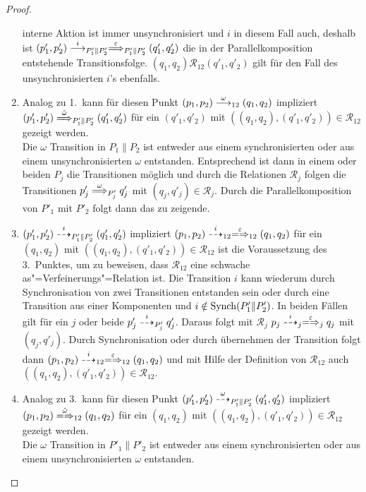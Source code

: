 \begin{proof}
\begin{enumerate}
      interne Aktion ist immer unsynchronisiert und $i$ in diesem Fall auch,
      deshalb ist $(p'_1,p'_2)\must[i]_{P'_1\|P'_2}
      \weakmust[\varepsilon]_{P'_1\|P'_2} (q'_1,q'_2)$ die in der
      Parallelkomposition entstehende Transitionsfolge.
      $(q_1,q_2)\mathcal{R}_{12}(q'_1,q'_2)$ gilt für den Fall des
      unsynchronisierten $i$'s ebenfalls.
    \item Analog zu 1.\ kann für diesen Punkt
      $(p_1,p_2)\must[\omega]_{12}(q_1,q_2)$ impliziert $(p'_1,p'_2)
      \weakmust[\hat{\omega}]_{P'_1\|P'_2} (q'_1,q'_2)$ für ein $(q'_1,q'_2)$
      mit $((q_1,q_2),(q'_1,q'_2))\in\mathcal{R}_{12}$ gezeigt werden.\\
      Die $\omega$ Transition in $P_1\|P_2$ ist entweder aus einem
      synchronisierten oder aus einem unsynchronisierten $\omega$ entstanden.
      Entsprechend ist dann in einem oder beiden $P_j$ die Transitionen möglich
      und durch die Relationen $\mathcal{R}_j$ folgen die Transitionen $p'_j
      \weakmust[\omega]_{P'_j} q'_j$ mit $(q_j,q'_j)\in\mathcal{R}_j$. Durch
      die Parallelkomposition von $P'_1$ mit $P'_2$ folgt dann das zu zeigende.
    \item $(p'_1,p'_2)\may[i]_{P'_1\|P'_2}(q'_1,q'_2)$ impliziert $(p_1,p_2)
      \may[i]_{12} \weakmay[\varepsilon]_{12} (q_1,q_2)$ für ein $(q_1,q_2)$
      mit $((q_1,q_2),(q'_1,q'_2))\in\mathcal{R}_{12}$ ist die Voraussetzung
      des 3.\ Punktes, um zu beweisen, dass $\mathcal{R}_{12}$ eine schwache
      as"=Verfeinerungs"=Relation ist. Die Transition $i$ kann wiederum durch
      Synchronisation von zwei Transitionen entstanden sein oder durch eine
      Transition aus einer Komponenten und $i\notin\mathrm{Synch} (P'_1\|P'_2)$. In
      beiden Fällen gilt für ein $j$ oder beide $p'_j\may[i]_{P'_j}q'_j$.
      Daraus folgt mit $\mathcal{R}_j$ $p_j \may[i]_j \weakmay[\varepsilon]_j
      q_j$ mit $(q_j,q'_j)$. Durch Synchronisation oder durch übernehmen der
      Transition folgt dann $(p_1,p_2) \may[i]_{12} \weakmay[\varepsilon]_{12}
      (q_1,q_2)$ und mit Hilfe der Definition von $\mathcal{R}_{12}$ auch
      $((q_1,q_2),(q'_1,q'_2))\in\mathcal{R}_{12}$.
    \item Analog zu 3.\ kann für diesen Punkt
      $(p'_1,p'_2)\may[\omega]_{P'_1\|P'_2}(q'_1,q'_2)$ impliziert $(p_1,p_2)
      \weakmay[\hat{\omega}]_{12} (q_1,q_2)$ für ein $(q_1,q_2)$ mit
      $((q_1,q_2),(q'_1,q'_2))\in\mathcal{R}_{12}$ gezeigt werden.\\
      Die $\omega$ Transition in $P'_1\|P'_2$ ist entweder aus einem
      synchronisierten oder aus einem unsynchronisierten $\omega$ entstanden.

\end{enumerate}
\end{proof}
